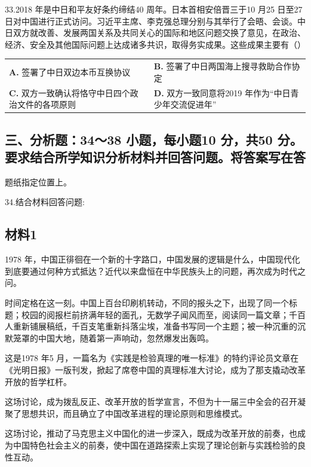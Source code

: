 \documentclass[UTF8,11pt]{ctexart}
\begin{document}
33.2018 年是中日和平友好条约缔结40 周年。日本首相安倍晋三于10 月25 日至27 日对中国进行正式访问。习近平主席、李克强总理分别与其举行了会晤、会谈。中日双方就改善、发展两国关系及共同关心的国际和地区问题交换了意见，在政治、经济、安全及其他国际问题上达成诸多共识，取得务实成果。这些成果主要有（）


\begin{center}\begin{tabular}{>{\raggedright\arraybackslash}p{\dimexpr(\linewidth-4\tabcolsep)/2\relax}>{\raggedright\arraybackslash}p{\dimexpr(\linewidth-4\tabcolsep)/2\relax}}
\textbf{A.} 签署了中日双边本币互换协议 & \textbf{B.} 签署了中日两国海上搜寻救助合作协定\\[.35em]
\textbf{C.} 双方一致确认将恪守中日四个政治文件的各项原则 & \textbf{D.} 双方一致同意将2019 年作为“中日青少年交流促进年”\\[.35em]\end{tabular}\end{center}

\subsection*{三、分析题：34～38 小题，每小题10 分，共50 分。要求结合所学知识分析材料并回答问题。将答案写在答}

题纸指定位置上。


34.结合材料回答问题:


\subsection*{材料1}

1978 年，中国正徘徊在一个新的十字路口，中国发展的逻辑是什么，中国现代化到底要通过何种方式抵达？近代以来盘恒在中华民族头上的问题，再次成为时代之问。

时间定格在这一刻。中国上百台印刷机转动，不同的报头之下，出现了同一个标题；校园的阅报栏前挤满年轻的面孔，无数学子闻风而至，阅读同一篇文章；千百人重新铺展稿纸，千百支笔重新抖落尘埃，准备书写同一个主题；被一种沉重的沉默笼罩的中国大地，随着第一声响动，忽然爆发出轰鸣。

这是1978 年5 月，一篇名为《实践是检验真理的唯一标准》的特约评论员文章在《光明日报》一版刊发，掀起了席卷中国的真理标准大讨论，成为了那支撬动改革开放的哲学杠杆。

这场讨论，成为拨乱反正、改革开放的哲学宣言，不但为十一届三中全会的召开凝聚了思想共识，而且确立了中国改革进程的理论原则和思维模式。

这场讨论，推动了马克思主义中国化的进一步深入，既成为改革开放的前奏，也成为中国特色社会主义的前奏，使中国在道路探索上实现了理论创新与实践检验的良性互动。
\end{document}
